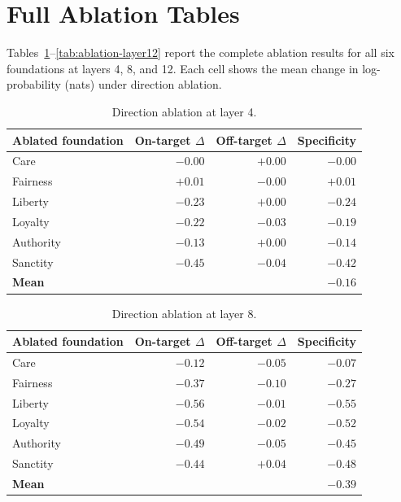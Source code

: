 \section{Full Ablation Tables}
\label{app:ablation-tables}

Tables~\ref{tab:ablation-layer4}--\ref{tab:ablation-layer12} report the complete ablation results for all six foundations at layers 4, 8, and 12.
Each cell shows the mean change in log-probability (nats) under direction ablation.

\begin{table}[h]
\centering
\small
\begin{tabular}{l rrr}
\toprule
Ablated foundation & On-target $\Delta$ & Off-target $\Delta$ & Specificity \\
\midrule
Care           & $-0.00$ & $+0.00$ & $-0.00$ \\
Fairness       & $+0.01$ & $-0.00$ & $+0.01$ \\
Liberty        & $-0.23$ & $+0.00$ & $-0.24$ \\
Loyalty        & $-0.22$ & $-0.03$ & $-0.19$ \\
Authority      & $-0.13$ & $+0.00$ & $-0.14$ \\
Sanctity       & $-0.45$ & $-0.04$ & $-0.42$ \\
\midrule
\textbf{Mean}  &         &         & $\mathbf{-0.16}$ \\
\bottomrule
\end{tabular}
\caption{Direction ablation at layer 4.}
\label{tab:ablation-layer4}
\end{table}

\begin{table}[h]
\centering
\small
\begin{tabular}{l rrr}
\toprule
Ablated foundation & On-target $\Delta$ & Off-target $\Delta$ & Specificity \\
\midrule
Care           & $-0.12$ & $-0.05$ & $-0.07$ \\
Fairness       & $-0.37$ & $-0.10$ & $-0.27$ \\
Liberty        & $-0.56$ & $-0.01$ & $-0.55$ \\
Loyalty        & $-0.54$ & $-0.02$ & $-0.52$ \\
Authority      & $-0.49$ & $-0.05$ & $-0.45$ \\
Sanctity       & $-0.44$ & $+0.04$ & $-0.48$ \\
\midrule
\textbf{Mean}  &         &         & $\mathbf{-0.39}$ \\
\bottomrule
\end{tabular}
\caption{Direction ablation at layer 8.}
\label{tab:ablation-layer8}
\end{table}

